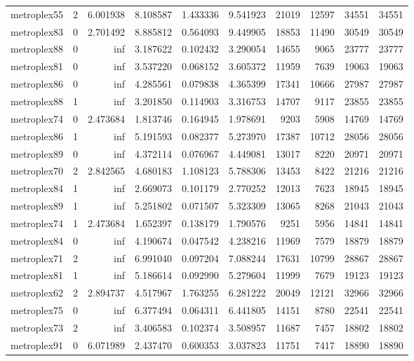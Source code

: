 \begin{longtable}{|l|r|r|r|r|r|r|r|r|r|}
metroplex55 & 2 & 6.001938 & 8.108587 & 1.433336 & 9.541923 & 21019 & 12597 & 34551 & 34551 \\
metroplex83 & 0 & 2.701492 & 8.885812 & 0.564093 & 9.449905 & 18853 & 11490 & 30549 & 30549 \\
metroplex88 & 0 & inf & 3.187622 & 0.102432 & 3.290054 & 14655 & 9065 & 23777 & 23777 \\
metroplex81 & 0 & inf & 3.537220 & 0.068152 & 3.605372 & 11959 & 7639 & 19063 & 19063 \\
metroplex86 & 0 & inf & 4.285561 & 0.079838 & 4.365399 & 17341 & 10666 & 27987 & 27987 \\
metroplex88 & 1 & inf & 3.201850 & 0.114903 & 3.316753 & 14707 & 9117 & 23855 & 23855 \\
metroplex74 & 0 & 2.473684 & 1.813746 & 0.164945 & 1.978691 & 9203 & 5908 & 14769 & 14769 \\
metroplex86 & 1 & inf & 5.191593 & 0.082377 & 5.273970 & 17387 & 10712 & 28056 & 28056 \\
metroplex89 & 0 & inf & 4.372114 & 0.076967 & 4.449081 & 13017 & 8220 & 20971 & 20971 \\
metroplex70 & 2 & 2.842565 & 4.680183 & 1.108123 & 5.788306 & 13453 & 8422 & 21216 & 21216 \\
metroplex84 & 1 & inf & 2.669073 & 0.101179 & 2.770252 & 12013 & 7623 & 18945 & 18945 \\
metroplex89 & 1 & inf & 5.251802 & 0.071507 & 5.323309 & 13065 & 8268 & 21043 & 21043 \\
metroplex74 & 1 & 2.473684 & 1.652397 & 0.138179 & 1.790576 & 9251 & 5956 & 14841 & 14841 \\
metroplex84 & 0 & inf & 4.190674 & 0.047542 & 4.238216 & 11969 & 7579 & 18879 & 18879 \\
metroplex71 & 2 & inf & 6.991040 & 0.097204 & 7.088244 & 17631 & 10799 & 28867 & 28867 \\
metroplex81 & 1 & inf & 5.186614 & 0.092990 & 5.279604 & 11999 & 7679 & 19123 & 19123 \\
metroplex62 & 2 & 2.894737 & 4.517967 & 1.763255 & 6.281222 & 20049 & 12121 & 32966 & 32966 \\
metroplex75 & 0 & inf & 6.377494 & 0.064311 & 6.441805 & 14151 & 8780 & 22541 & 22541 \\
metroplex73 & 2 & inf & 3.406583 & 0.102374 & 3.508957 & 11687 & 7457 & 18802 & 18802 \\
metroplex91 & 0 & 6.071989 & 2.437470 & 0.600353 & 3.037823 & 11751 & 7417 & 18890 & 18890 \\

\end{longtable}
